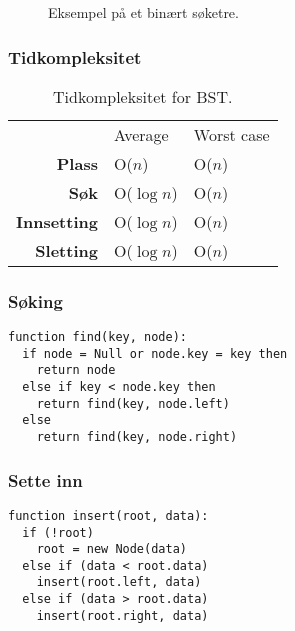\documentclass[11pt,a4paper]{article}
\theoremstyle{def}
\begin{document}
\begin{figure}[h!]
\centering
{}
\label{fig:simplebst}
\caption{Eksempel på et binært søketre.}
\end{figure}

\subsubsection{Tidkompleksitet}
\begin{table}[h!]
\centering
\begin{tabular}{rll}
&Average&Worst case\\
\textbf{Plass} & O($n$) & O($n$)\\
\textbf{Søk} & O($\log n$) & O($n$)\\
\textbf{Innsetting} & O($\log n$) & O($n$)\\
\textbf{Sletting} & O($\log n$) & O($n$)\\
\end{tabular}
\label{tab:obst}
\caption{Tidkompleksitet for BST.}
\end{table}

\newpage
\subsubsection{Søking}
\begin{Verbatim}[frame=single]
function find(key, node):
  if node = Null or node.key = key then
    return node
  else if key < node.key then
    return find(key, node.left)
  else
    return find(key, node.right)
\end{Verbatim}

\subsubsection{Sette inn}
\begin{Verbatim}[frame=single]
function insert(root, data):
  if (!root)
    root = new Node(data)
  else if (data < root.data)
    insert(root.left, data)
  else if (data > root.data)
    insert(root.right, data)
\end{Verbatim}
\end{document}
